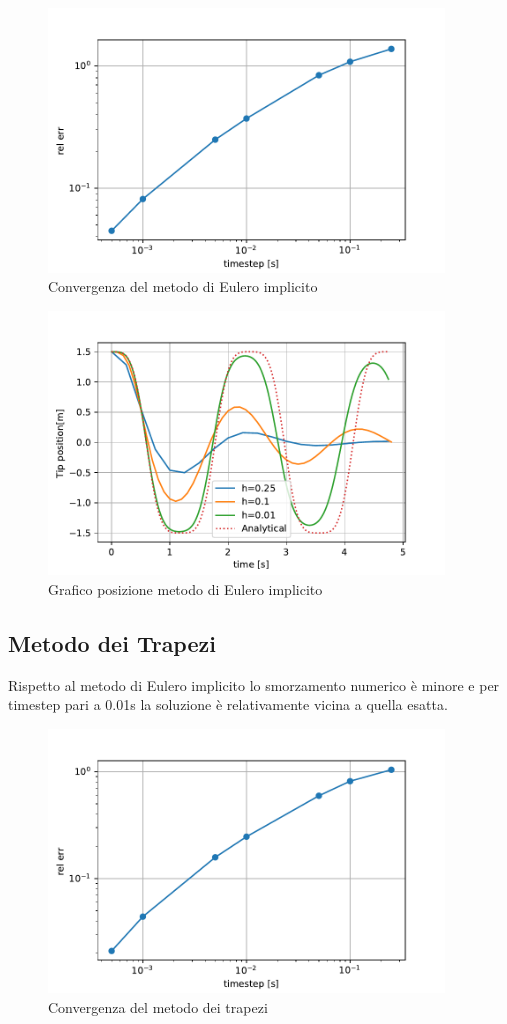 \begin{figure}[h!]
\centering
\includegraphics[height=7cm]{Figure/Convergenza/EulImp_err.pdf}
\caption{Convergenza del metodo di Eulero implicito}
 \label{fig:EulImp_err}
\end{figure}

\begin{figure}[h!]
\centering
\includegraphics[height=7cm]{Figure/Convergenza/EulImp_pos.pdf}
\caption{Grafico posizione metodo di Eulero implicito}
 \label{fig:EulImp_pos}
\end{figure}
\FloatBarrier
\subsection{Metodo dei Trapezi}
Rispetto al metodo di Eulero implicito lo smorzamento numerico è minore e per timestep pari a 0.01s la soluzione è relativamente vicina a quella esatta.
\begin{figure}[h!]
\centering
\includegraphics[height=7cm]{Figure/Convergenza/Trapz_err.pdf}
\caption{Convergenza del metodo dei trapezi}
 \label{fig:Trapz_err}
\end{figure}

